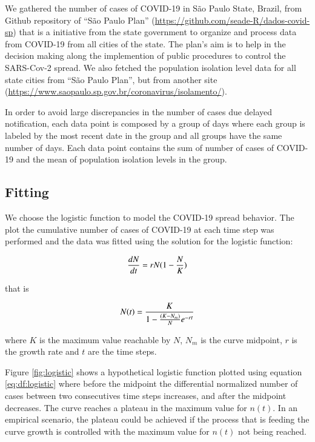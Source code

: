 \documentclass[review]{elsarticle}
\begin{document}
We gathered the number of cases of COVID-19 in S\~{a}o Paulo State, Brazil, from Github 
repository of ``S\~{a}o Paulo Plan'' (\url{https://github.com/seade-R/dados-covid-sp}) 
that is a initiative from the state government to organize and process data from COVID-19 
from all cities of the state. 
The plan's aim is to help in the decision making along the implemention of public 
procedures to control the SARS-Cov-2 spread. 
We also fetched the population isolation level data 
for all state cities  from 
``S\~{a}o Paulo Plan'', but from another site (\url{https://www.saopaulo.sp.gov.br/coronavirus/isolamento/}).

In order to avoid large discrepancies in the number of cases due delayed notification, 
 each data point is composed by a group of days where each group is labeled by the most 
 recent date in the group and all groups have the same number of days. 
 Each data point contains the sum of number of cases of {COVID-19} and 
 the mean of population isolation levels 
 in the group.

\subsection{Fitting}

We choose the logistic function to model the COVID-19 spread behavior. 
The plot the cumulative number of cases of COVID-19 at each time step 
was performed and the data was fitted using the solution for the logistic function:

\begin{equation}
{dN \over dt} = r N (1 - {N \over K})
\label{eq:df:logistic}
\end{equation}

\noindent that is

\begin{equation}
N(t) = {K \over {1- {(K-N_{m}) \over N} e^{-rt}}}
\label{eq:exp:logistic}
\end{equation}

\noindent where $K$ is the maximum value reachable by $N$, 
$N_m$ is the curve midpoint, 
$r$ is the growth rate 
and $t$ are the time steps.

Figure \ref{fig:logistic} shows a hypothetical logistic function 
plotted using equation \ref{eq:df:logistic} where before the midpoint 
the differential normalized number of cases between 
two consecutives time steps increases, 
and after the midpoint decreases. 
The curve reaches a plateau in the maximum value for $n(t)$. 
In an empirical scenario, the plateau could be achieved 
if the process that is feeding the curve 
growth is controlled with the maximum 
value for $n(t)$ not being reached.
\end{document}
